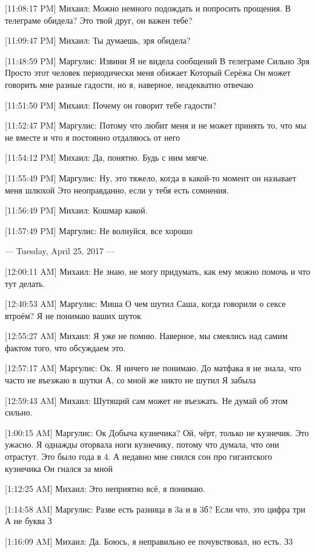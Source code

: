 \documentclass{article}
\begin{document}
[11:08:17 PM] Михаил:
Можно немного подождать и попросить прощения. В телеграме обидела?
 Это твой друг, он важен тебе?

[11:09:47 PM] Михаил:
Ты думаешь, зря обидела?

[11:48:59 PM] Маргулис:
Извини
 Я не видела сообщений
 В телеграме
 Сильно
 Зря
 Просто этот человек периодически меня обижает
 Который Серёжа
 Он может говорить мне разные гадости, но я, наверное, неадекватно отвечаю

[11:51:50 PM] Михаил:
Почему он говорит тебе гадости?

[11:52:47 PM] Маргулис:
Потому что любит меня и не может принять то, что мы не вместе и что я постоянно отдаляюсь от него

[11:54:12 PM] Михаил:
Да, понятно. Будь с ним мягче.

[11:55:49 PM] Маргулис:
Ну, это тяжело, когда в какой-то момент он называет меня шлюхой
 Это неоправданно, если у тебя есть сомнения.

[11:56:49 PM] Михаил:
Кошмар какой.

[11:57:49 PM] Маргулис:
Не волнуйся, все хорошо

--- Tuesday, April 25, 2017 ---

[12:00:11 AM] Михаил:
Не знаю, не могу придумать, как ему можно помочь и что тут делать.

[12:40:53 AM] Маргулис:
Миша
 О чем шутил Саша, когда говорили о сексе втроём?
 Я не понимаю ваших шуток

[12:55:27 AM] Михаил:
Я уже не помню. Наверное, мы смеялись над самим фактом того, что обсуждаем это.

[12:57:17 AM] Маргулис:
Ок. Я ничего не понимаю. До матфака я не знала, что часто не въезжаю в шутки
 А, со мной же никто не шутил
 Я забыла

[12:59:43 AM] Михаил:
Шутящий сам может не въезжать. Не думай об этом сильно.

[1:00:15 AM] Маргулис:
Ок
 Добыча кузнечика?
 Ой, чёрт, только не кузнечик.
 Это ужасно.
 Я однажды оторвала ноги кузнечику, потому что думала, что они отрастут. Это было года в 4. А недавно мне снился сон про гигантского кузнечика
 Он гнался за мной

[1:12:25 AM] Михаил:
Это неприятно всё, я понимаю.

[1:14:58 AM] Маргулис:
Разве есть разница в 3а и в 3б?
 Если что, это цифра три
 А не буква З

[1:16:09 AM] Михаил:
Да. Боюсь, я неправильно ее почувствовал, но есть.
 З3
\end{document}
